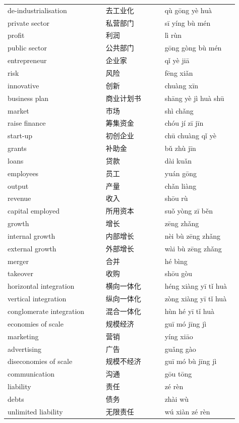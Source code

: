 \documentclass[11pt]{article}
\begin{document}
\begin{longtable}{@{}p{0.40\linewidth}p{0.24\linewidth}p{0.30\linewidth}@{}}
de-industrialisation & 去工业化 & qù gōng yè huà \\
private sector & 私营部门 & sī yíng bù mén \\
profit & 利润 & lì rùn \\
public sector & 公共部门 & gōng gòng bù mén \\
entrepreneur & 企业家 & qǐ yè jiā \\
risk & 风险 & fēng xiǎn \\
innovative & 创新 & chuàng xīn \\
business plan & 商业计划书 & shāng yè jì huà shū \\
market & 市场 & shì chǎng \\
raise finance & 筹集资金 & chóu jí zī jīn \\
start-up & 初创企业 & chū chuàng qǐ yè \\
grants & 补助金 & bǔ zhù jīn \\
loans & 贷款 & dài kuǎn \\
employees & 员工 & yuán gōng \\
output & 产量 & chǎn liàng \\
revenue & 收入 & shōu rù \\
capital employed & 所用资本 & suǒ yòng zī běn \\
growth & 增长 & zēng zhǎng \\
internal growth & 内部增长 & nèi bù zēng zhǎng \\
external growth & 外部增长 & wài bù zēng zhǎng \\
merger & 合并 & hé bìng \\
takeover & 收购 & shōu gòu \\
horizontal integration & 横向一体化 & héng xiàng yī tǐ huà \\
vertical integration & 纵向一体化 & zòng xiàng yī tǐ huà \\
conglomerate integration & 混合一体化 & hùn hé yī tǐ huà \\
economies of scale & 规模经济 & guī mó jīng jì \\
marketing & 营销 & yíng xiāo \\
advertising & 广告 & guǎng gào \\
diseconomies of scale & 规模不经济 & guī mó bù jīng jì \\
communication & 沟通 & gōu tōng \\
liability & 责任 & zé rèn \\
debts & 债务 & zhài wù \\
unlimited liability & 无限责任 & wú xiàn zé rèn \\

\end{longtable}
\end{document}
